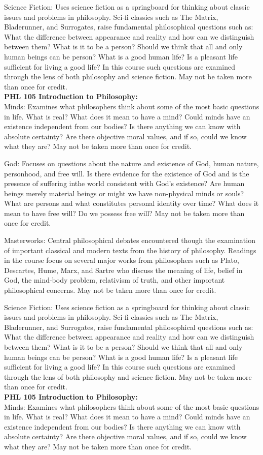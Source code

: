 \documentclass[
  letterpaper,
]{scrbook}
\begin{document}
Science Fiction: Uses science fiction as a springboard for thinking
about classic issues and problems in philosophy. Sci-fi classics such as
The Matrix, Bladerunner, and Surrogates, raise fundamental philosophical
questions such as: What the difference between appearance and reality
and how can we distinguish between them? What is it to be a person?
Should we think that all and only human beings can be person? What is a
good human life? Is a pleasant life sufficient for living a good life?
In this course such questions are examined through the lens of both
philosophy and science fiction. May not be taken more than once for
credit.\\
\textbf{PHL 105 Introduction to Philosophy:}\\
Minds: Examines what philosophers think about some of the most basic
questions in life. What is real? What does it mean to have a mind? Could
minds have an existence independent from our bodies? Is there anything
we can know with absolute certainty? Are there objective moral values,
and if so, could we know what they are? May not be taken more than once
for credit.

God: Focuses on questions about the nature and existence of God, human
nature, personhood, and free will. Is there evidence for the existence
of God and is the presence of suffering inthe world consistent with
God's existence? Are human beings merely material beings or might we
have non-physical minds or souls? What are persons and what constitutes
personal identity over time? What does it mean to have free will? Do we
possess free will? May not be taken more than once for credit.

Masterworks: Central philosophical debates encountered though the
examination of important classical and modern texts from the history of
philosophy. Readings in the course focus on several major works from
philosophers such as Plato, Descartes, Hume, Marx, and Sartre who
discuss the meaning of life, belief in God, the mind-body problem,
relativism of truth, and other important philosophical concerns. May not
be taken more than once for credit.

Science Fiction: Uses science fiction as a springboard for thinking
about classic issues and problems in philosophy. Sci-fi classics such as
The Matrix, Bladerunner, and Surrogates, raise fundamental philosophical
questions such as: What the difference between appearance and reality
and how can we distinguish between them? What is it to be a person?
Should we think that all and only human beings can be person? What is a
good human life? Is a pleasant life sufficient for living a good life?
In this course such questions are examined through the lens of both
philosophy and science fiction. May not be taken more than once for
credit.\\
\textbf{PHL 105 Introduction to Philosophy:}\\
Minds: Examines what philosophers think about some of the most basic
questions in life. What is real? What does it mean to have a mind? Could
minds have an existence independent from our bodies? Is there anything
we can know with absolute certainty? Are there objective moral values,
and if so, could we know what they are? May not be taken more than once
for credit.
\end{document}
